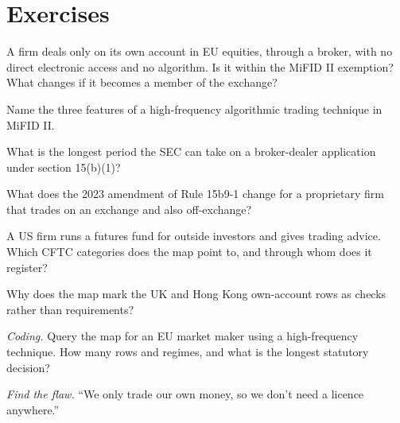 \section{Exercises}

\begin{exercise}[$\star$]\label{exo:fm:regulators-and-licences:1}
A firm deals only on its own account in EU equities, through a broker, with no direct electronic access and no algorithm. Is it within the MiFID
II exemption? What changes if it becomes a member of the exchange?
\end{exercise}

\begin{exercise}[$\star$]\label{exo:fm:regulators-and-licences:2}
Name the three features of a high-frequency algorithmic trading technique in MiFID II.
\end{exercise}

\begin{exercise}[$\star$]\label{exo:fm:regulators-and-licences:3}
What is the longest period the SEC can take on a broker-dealer application under section 15(b)(1)?
\end{exercise}

\begin{exercise}[$\star\star$]\label{exo:fm:regulators-and-licences:4}
What does the 2023 amendment of Rule 15b9-1 change for a proprietary firm that trades on an exchange and also off-exchange?
\end{exercise}

\begin{exercise}[$\star\star$]\label{exo:fm:regulators-and-licences:5}
A US firm runs a futures fund for outside investors and gives trading advice. Which CFTC categories does the map point to, and through whom does it
register?
\end{exercise}

\begin{exercise}[$\star\star$]\label{exo:fm:regulators-and-licences:6}
Why does the map mark the UK and Hong Kong own-account rows as checks rather than requirements?
\end{exercise}

\begin{exercise}[$\star\star\star$]\label{exo:fm:regulators-and-licences:7}
\emph{Coding.} Query the map for an EU market maker using a high-frequency technique. How many rows and regimes, and what is the longest statutory
decision?
\end{exercise}

\begin{exercise}[$\star\star\star$]\label{exo:fm:regulators-and-licences:8}
\emph{Find the flaw.} ``We only trade our own money, so we don't need a licence anywhere.''
\end{exercise}

